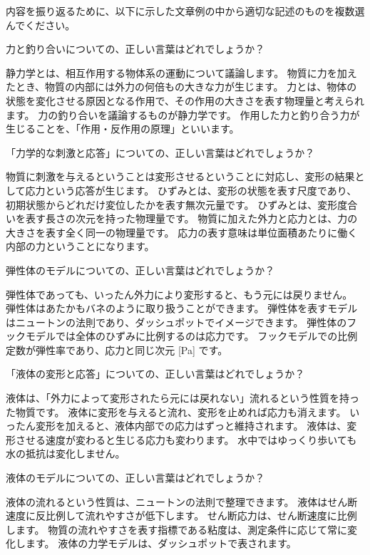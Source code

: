 \documentclass[uplatex,dvipdfmx,a4paper,11pt]{jsarticle}
\begin{document}
内容を振り返るために、以下に示した文章例の中から適切な記述のものを複数選んでください。
	\begin{qlist}
		\qitem 力と釣り合いについての、正しい言葉はどれでしょうか？
		\begin{qlist2}
			\qitem 静力学とは、相互作用する物体系の運動について議論します。
			\qitem 物質に力を加えたとき、物質の内部には外力の何倍もの大きな力が生じます。
			\qitem 力とは、物体の状態を変化させる原因となる作用で、その作用の大きさを表す物理量と考えられます。
			\qitem 力の釣り合いを議論するものが静力学です。
			\qitem 作用した力と釣り合う力が生じることを、「作用・反作用の原理」といいます。
		\end{qlist2}
    \vspace{3mm}
	\qitem 「力学的な刺激と応答」についての、正しい言葉はどれでしょうか？
		\begin{qlist2}
			\qitem 物質に刺激を与えるということは変形させるということに対応し、変形の結果として応力という応答が生じます。
			\qitem ひずみとは、変形の状態を表す尺度であり、初期状態からどれだけ変位したかを表す無次元量です。
			\qitem ひずみとは、変形度合いを表す長さの次元を持った物理量です。
			\qitem 物質に加えた外力と応力とは、力の大きさを表す全く同一の物理量です。
			\qitem 応力の表す意味は単位面積あたりに働く内部の力ということになります。
		\end{qlist2}
    \vspace{3mm}
	\qitem 弾性体のモデルについての、正しい言葉はどれでしょうか？
		\begin{qlist2}
			\qitem 弾性体であっても、いったん外力により変形すると、もう元には戻りません。
			\qitem 弾性体はあたかもバネのように取り扱うことができます。
			\qitem 弾性体を表すモデルはニュートンの法則であり、ダッシュポットでイメージできます。
			\qitem 弾性体のフックモデルでは全体のひずみに比例するのは応力です。
			\qitem フックモデルでの比例定数が弾性率であり、応力と同じ次元 [Pa] です。
		\end{qlist2}
    \vspace{3mm}
	\qitem 「液体の変形と応答」についての、正しい言葉はどれでしょうか？
	\begin{qlist2}
		\qitem 液体は、「外力によって変形されたら元には戻れない」流れるという性質を持った物質です。
		\qitem 液体に変形を与えると流れ、変形を止めれば応力も消えます。
		\qitem いったん変形を加えると、液体内部での応力はずっと維持されます。
		\qitem 液体は、変形させる速度が変わると生じる応力も変わります。
		\qitem 水中ではゆっくり歩いても水の抵抗は変化しません。
	\end{qlist2}
  \vspace{3mm}
	\qitem 液体のモデルについての、正しい言葉はどれでしょうか？
	\begin{qlist2}
		\qitem 液体の流れるという性質は、ニュートンの法則で整理できます。
		\qitem 液体はせん断速度に反比例して流れやすさが低下します。
		\qitem せん断応力は、せん断速度に比例します。
		\qitem 物質の流れやすさを表す指標である粘度は、測定条件に応じて常に変化します。
		\qitem 液体の力学モデルは、ダッシュポットで表されます。
	\end{qlist2}
\end{qlist}
\end{document}
